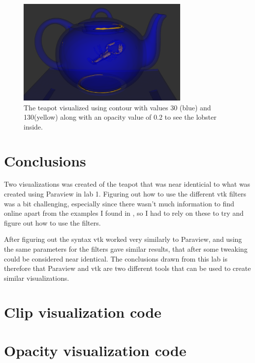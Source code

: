 \documentclass{article}
\begin{document}
    \begin{figure}[H]
        \centering
        \includegraphics[width=0.75\textwidth]{../img/opacity.png}
        \caption{The  teapot  visualized  using  contour  with  values  30  (blue)  and  130(yellow) along with an opacity value of 0.2 to see the lobster inside.}
        \label{fig:opacity}
    \end{figure}

    \section{Conclusions}
    Two visualizations was created of the teapot that was near identicial to what was created using Paraview in lab 1. Figuring out how to use the different vtk filters was a bit challenging, especially since there wasn't much information to find online apart from the examples I found in \cite{vtk-examples}, so I had to rely on these to try and figure out how to use the filters. 

    After figuring out the syntax vtk worked very similarly to Paraview, and using the same parameters for the filters gave similar results, that after some tweaking could be considered near identical. The conclusions drawn from this lab is therefore that Paraview and vtk are two different tools that can be used to create similar visualizations.


    \newpage
    \begin{appendices}

        \section{Clip visualization code}
        \label{appendix:clip}

        

        \newpage
        \section{Opacity visualization code}
        \label{appendix:opacity}

             

    \end{appendices}
\end{document}
